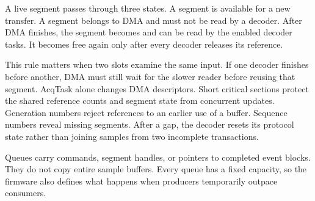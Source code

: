 \documentclass[11pt,a4paper]{article}
\newcommand{\code}[1]{\texttt{\detokenize{#1}}}
\begin{document}
A live segment passes through three states. A \code{FREE} segment is available
for a new transfer. A \code{DMA_OWNED} segment belongs to DMA and must not be read
by a decoder. After DMA finishes, the segment becomes \code{CPU_OWNED} and can be
read by the enabled decoder tasks. It becomes free again only after every
decoder releases its reference.

This rule matters when two slots examine the same input. If one decoder finishes
before another, DMA must still wait for the slower reader before reusing that
segment. AcqTask alone changes DMA descriptors. Short critical sections protect
the shared reference counts and segment state from concurrent updates.
Generation numbers reject references to an earlier use of a buffer. Sequence
numbers reveal missing segments. After a gap, the decoder resets its protocol
state rather than joining samples from two incomplete transactions.

Queues carry commands, segment handles, or pointers to completed event blocks.
They do not copy entire sample buffers. Every queue has a fixed capacity, so the
firmware also defines what happens when producers temporarily outpace consumers.
\end{document}
